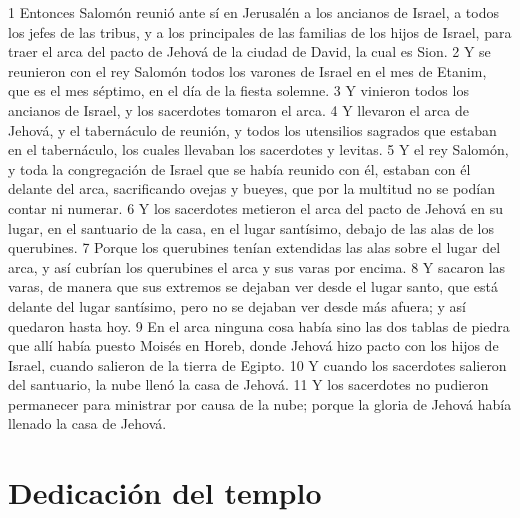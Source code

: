 1 Entonces Salomón reunió ante sí en Jerusalén a los ancianos de Israel, a todos los jefes de las tribus, y a los principales de las familias de los hijos de Israel, para traer el arca del pacto de Jehová de la ciudad de David, la cual es Sion.
2 Y se reunieron con el rey Salomón todos los varones de Israel en el mes de Etanim, que es el mes séptimo, en el día de la fiesta solemne.
3 Y vinieron todos los ancianos de Israel, y los sacerdotes tomaron el arca.
4 Y llevaron el arca de Jehová, y el tabernáculo de reunión, y todos los utensilios sagrados que estaban en el tabernáculo, los cuales llevaban los sacerdotes y levitas.
5 Y el rey Salomón, y toda la congregación de Israel que se había reunido con él, estaban con él delante del arca, sacrificando ovejas y bueyes, que por la multitud no se podían contar ni numerar.
6 Y los sacerdotes metieron el arca del pacto de Jehová en su lugar, en el santuario de la casa, en el lugar santísimo, debajo de las alas de los querubines. 
7 Porque los querubines tenían extendidas las alas sobre el lugar del arca, y así cubrían los querubines el arca y sus varas por encima.
8 Y sacaron las varas, de manera que sus extremos se dejaban ver desde el lugar santo, que está delante del lugar santísimo, pero no se dejaban ver desde más afuera; y así quedaron hasta hoy.
9 En el arca ninguna cosa había sino las dos tablas de piedra que allí había puesto Moisés en Horeb, donde Jehová hizo pacto con los hijos de Israel, cuando salieron de la tierra de Egipto.
10 Y cuando los sacerdotes salieron del santuario, la nube llenó la casa de Jehová.
11 Y los sacerdotes no pudieron permanecer para ministrar por causa de la nube; porque la gloria de Jehová había llenado la casa de Jehová. 

\section*{Dedicación del templo}

